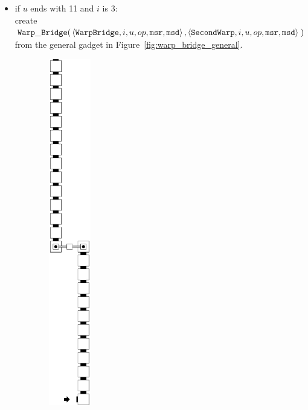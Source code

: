 \begin{itemize}
\begin{itemize}
            \item if $u$ ends with 11 and $i$ is 3: \\
            create
            $\begin{aligned}[t]
                {\tt Warp\_Bridge}(& \left\langle {\tt WarpBridge}, i, u, op, {\tt msr}, {\tt msd} \right\rangle,
                              \left\langle {\tt SecondWarp}, i, u, op, {\tt msr}, {\tt msd} \right\rangle \;)
            \end{aligned}$ \\ from the general gadget in Figure~\ref{fig:warp_bridge_general}.
            \vspace{.5cm}
        \end{itemize}

        \begin{figure}[H]
            \centering
            \begin{subfigure}[t]{0.2\textwidth}
                \centering
                \includegraphics[width=0.2\textwidth]{warping/warp_bridge_general}

\end{subfigure}
\end{figure}
\end{itemize}
